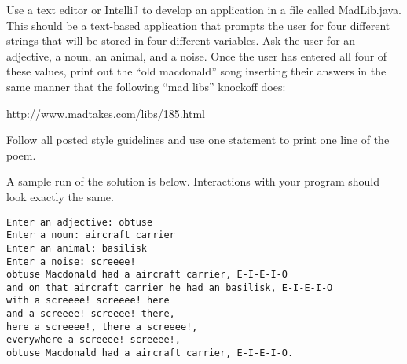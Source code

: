 Use a text editor or IntelliJ to develop an application in a file called MadLib.java. This should be a text-based application that prompts the user for four different strings that will be stored in four different variables. Ask the user for an adjective, a noun, an animal, and a noise. Once the user has entered all four of these values, print out the ``old macdonald'' song inserting their answers in the same manner that the following ``mad libs'' knockoff does:

http://www.madtakes.com/libs/185.html

Follow all posted style guidelines and use one statement to print one line of the poem. 

A sample run of the solution is below. Interactions with your program should look exactly the same. 

\begin{verbatim}
Enter an adjective: obtuse
Enter a noun: aircraft carrier
Enter an animal: basilisk
Enter a noise: screeee!
obtuse Macdonald had a aircraft carrier, E-I-E-I-O
and on that aircraft carrier he had an basilisk, E-I-E-I-O
with a screeee! screeee! here
and a screeee! screeee! there,
here a screeee!, there a screeee!,
everywhere a screeee! screeee!,
obtuse Macdonald had a aircraft carrier, E-I-E-I-O.
\end{verbatim}
